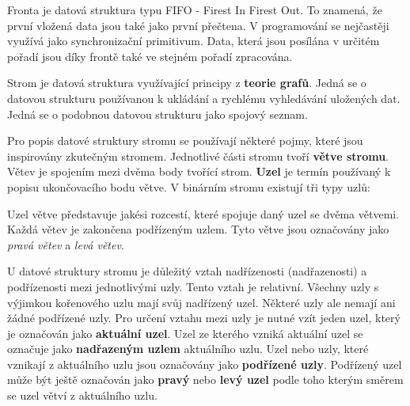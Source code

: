 Fronta je datová struktura typu FIFO - Firest In Firest Out. To znamená, že první vložená data jsou také jako první přečtena. V programování se nejčastěji využívá jako synchronizační primitivum. Data, která jsou posílána v určitém pořadí jsou díky frontě také ve stejném pořadí zpracována. 







Strom je datová struktura využívající principy z {\bf teorie grafů}. Jedná se o datovou strukturu používanou k ukládání a rychlému vyhledávání uložených dat. Jedná se o podobnou datovou strukturu jako spojový seznam. 



Pro popis datové struktury stromu se používají některé pojmy, které jsou inspirovány zkutečným stromem. Jednotlivé části stromu tvoří {\bf větve stromu}. Větev je spojením mezi dvěma body tvořící strom. {\bf Uzel} je termín používaný k popisu ukončovacího bodu větve. V binárním stromu existují tři typy uzlů:

\vskip 4mm
\vskip 4mm

Uzel větve představuje jakési rozcestí, které spojuje daný uzel se dvěma větvemi. Každá větev je zakončena podřízeným uzlem. Tyto větve jsou označovány jako {\it pravá větev} a {\it levá větev}.

U datové struktury stromu je důležitý vztah nadřízenosti (nadřazenosti) a podřízenosti mezi jednotlivými uzly. Tento vztah je relativní. Všechny uzly s výjimkou kořenového uzlu mají svůj nadřízený uzel. Některé uzly ale nemají ani žádné podřízené uzly. Pro určení vztahu mezi uzly je nutné vzít jeden uzel, který je označován jako {\bf aktuální uzel}. Uzel ze kterého vzniká aktuální uzel se označuje jako {\bf nadřazeným uzlem} aktuálního uzlu. Uzel nebo uzly, které vznikají z aktuálního uzlu jsou označovány jako {\bf podřízené uzly}. Podřízený uzel může být ještě označován jako {\bf pravý} nebo {\bf levý uzel} podle toho kterým směrem se uzel větví z aktuálního uzlu. 


